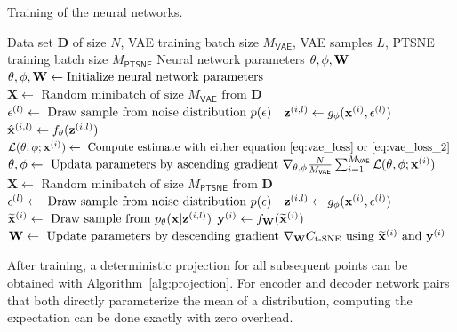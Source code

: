 \begin{algorithm}[H]
  \caption{Training of the neural networks.}
  \label{alg:learning}
  \begin{algorithmic}[1]
    \Require Data set $\mathbf{D}$ of size $N$, VAE training batch size $M_{\mathsf{VAE}}$, VAE samples $L$, PTSNE training batch size $M_{\mathsf{PTSNE}}$
    \Ensure Neural network parameters $\mathbf{\theta}, \mathbf{\phi}, \mathbf{W}$
    \State $\mathbf{\theta}, \mathbf{\phi}, \mathbf{W} \gets \text{Initialize neural network parameters}$
      \State $\mathbf{X} \gets \text{ Random minibatch of size } M_{\mathsf{VAE}} \text{ from } \mathbf{D}$
          \State $\mathbf{\epsilon}^{(l)} \gets \text{ Draw sample from noise distribution } p(\mathbf{\epsilon})$
          \State $\mathbf{z}^{(i,l)} \gets g_{\mathbf{\phi}}(\mathbf{x}^{(i)}, \mathbf{\epsilon}^{(l)})$ 
          \State $\hat{\mathbf{x}}^{(i,l)} \gets f_{\mathbf{\theta}}(\mathbf{z}^{(i,l)})$ 
        \EndFor
        \State $\mathcal{L}(\mathbf{\theta}, \mathbf{\phi}; \mathbf{x}^{(i)}) \gets \text{ Compute estimate with either equation \ref{eq:vae_loss} or \ref{eq:vae_loss_2} }$
      \EndFor
      \State $\mathbf{\theta}, \mathbf{\phi} \gets \text{ Updata parameters by ascending gradient } \nabla_{\mathbf{\theta}, \mathbf{\phi}} \frac{N}{M_{\mathsf{VAE}}} \sum_{i=1}^{M_{\mathsf{VAE}}} \mathcal{L}(\mathbf{\theta}, \mathbf{\phi}; \mathbf{x}^{(i)})$
    \EndWhile
      \State $\mathbf{X} \gets \text{ Random minibatch of size } M_{\mathsf{PTSNE}} \text{ from } \mathbf{D}$
        \State $\mathbf{\epsilon}^{(l)} \gets \text{ Draw sample from noise distribution } p(\mathbf{\epsilon})$
        \State $\mathbf{z}^{(i,l)} \gets g_{\mathbf{\phi}}(\mathbf{x}^{(i)}, \mathbf{\epsilon}^{(l)})$ 
        \State $\widetilde{\mathbf{x}}^{(i)} \gets \text{ Draw sample from } p_{\mathbf{\theta}}(\mathbf{x} \vert \mathbf{z}^{(i,l)})$ 
        \State $\mathbf{y}^{(i)} \gets f_{\mathbf{W}}(\widetilde{\mathbf{x}}^{(i)})$
      \EndFor
      \State $\mathbf{W} \gets \text{ Update parameters by descending gradient } \nabla_{\mathbf{W}} C_{\text{t-SNE}} \text{ using } \widetilde{\mathbf{x}}^{(i)} \text{ and } \mathbf{y}^{(i)}$
    \EndWhile
  \end{algorithmic}
\end{algorithm}


After training, a deterministic projection for all subsequent points can be obtained with Algorithm~\ref{alg:projection}. For encoder and decoder network pairs that both directly parameterize the mean of a distribution, computing the expectation can be done exactly with zero overhead.

